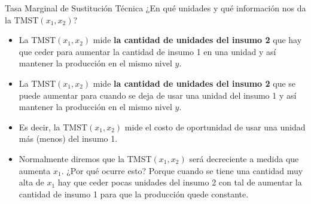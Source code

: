 \documentclass{beamer}
\theoremstyle{definition}
\begin{document}
\begin{frame}{Tasa Marginal de Sustitución Técnica}
¿En qué unidades y qué información nos da la TMST$(x_1,x_2)$?

\begin{itemize}
    \item \color{red} La TMST$(x_1,x_2)$ mide \textbf{la cantidad de unidades del insumo 2} que hay que ceder para aumentar la cantidad de insumo 1 en una unidad y así mantener la producción en el mismo nivel $y$.
    \item \color{blue} La TMST$(x_1,x_2)$ mide \textbf{la cantidad de unidades del insumo 2} que se puede aumentar para cuando se deja de usar una unidad del insumo 1 y así mantener la producción en el mismo nivel $y$.
    \item \color{black}Es decir, la TMST$(x_1,x_2)$ mide el costo de oportunidad de usar una unidad \color{red} más \color{blue}(menos) \color{black} del insumo 1.
    \item Normalmente diremos que la TMST$(x_1,x_2)$ será decreciente a medida que aumenta $x_1$. ¿Por qué ocurre esto? Porque cuando se tiene una cantidad muy alta de $x_1$ hay que ceder pocas unidades del insumo 2 con tal de aumentar la cantidad de insumo 1 para que la producción quede constante.
\end{itemize}

\end{frame}
\end{document}
